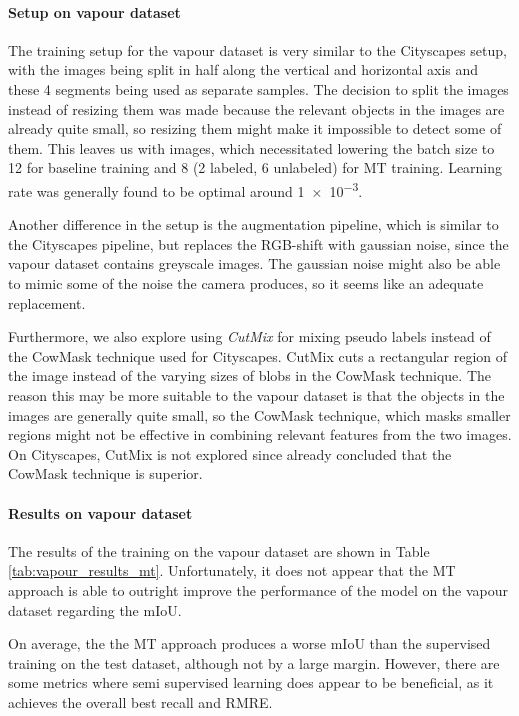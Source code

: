 \paragraph{Setup on vapour dataset}
The training setup for the vapour dataset is very similar to the Cityscapes setup, with the images being split in half along the vertical and horizontal axis and these 4 segments being used as separate samples. The decision to split the images instead of resizing them was made because the relevant objects in the images are already quite small, so resizing them might make it impossible to detect some of them. This leaves us with  images, which necessitated lowering the batch size to 12 for baseline training and 8 (2 labeled, 6 unlabeled) for MT training.
Learning rate was generally found to be optimal around \num{1e-3}.

Another difference in the setup is the augmentation pipeline, which is similar to the Cityscapes pipeline, but replaces the RGB-shift with gaussian noise, since the vapour dataset contains greyscale images. The gaussian noise might also be able to mimic some of the noise the camera produces, so it seems like an adequate replacement.

Furthermore, we also explore using \emph{CutMix}\cite{yunCutMixRegularizationStrategy2019} for mixing pseudo labels instead of the CowMask technique used for Cityscapes. 
CutMix cuts a rectangular region of the image instead of the varying sizes of blobs in the CowMask technique.
The reason this may be more suitable to the vapour dataset is that the objects in the images are generally quite small, so the CowMask technique, which masks smaller regions might not be effective in combining relevant features from the two images. On Cityscapes, CutMix is not explored since \cite{schererPseudoLabelNoiseSuppression2022} already concluded that the CowMask technique is superior.

\paragraph{Results on vapour dataset}

The results of the training on the vapour dataset are shown in Table \ref{tab:vapour_results_mt}. 
Unfortunately, it does not appear that the MT approach is able to outright improve the performance of the model on the vapour dataset regarding the mIoU.

On average, the the MT approach produces a worse mIoU than the supervised training on the test dataset, although not by a large margin. 
However, there are some metrics where semi supervised learning does appear to be beneficial, as it achieves the overall best recall and RMRE. 

